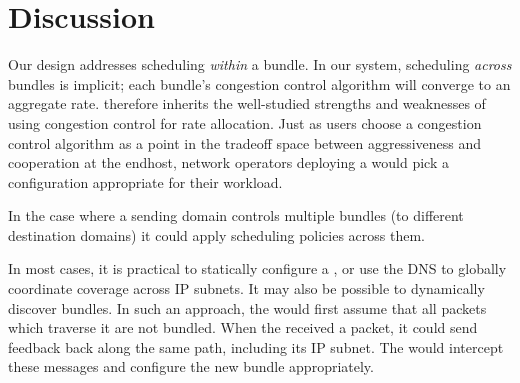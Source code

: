 \section{Discussion}\label{s:discussion}

 Our \name design addresses scheduling \emph{within} a bundle. In our system, scheduling \emph{across} bundles is implicit; each bundle's congestion control algorithm will converge to an aggregate rate. 
\name therefore inherits the well-studied strengths and weaknesses of using congestion control for rate allocation. 
Just as users choose a congestion control algorithm as a point in the tradeoff space between aggressiveness and cooperation at the endhost, network operators deploying a \name would pick a configuration appropriate for their workload.

In the case where a sending domain controls multiple bundles (to different destination domains) it could apply scheduling policies across them.

\label{s:impl:discovery}
In most cases, it is practical to statically configure a \pair, or use the DNS to globally coordinate \name coverage across IP subnets.
It may also be possible to dynamically discover bundles. 
In such an approach, the \inbox would first assume that all packets which traverse it are not bundled.
When the \outbox received a packet, it could send feedback back along the same path, including its IP subnet.
The \inbox would intercept these messages and configure the new bundle appropriately.



